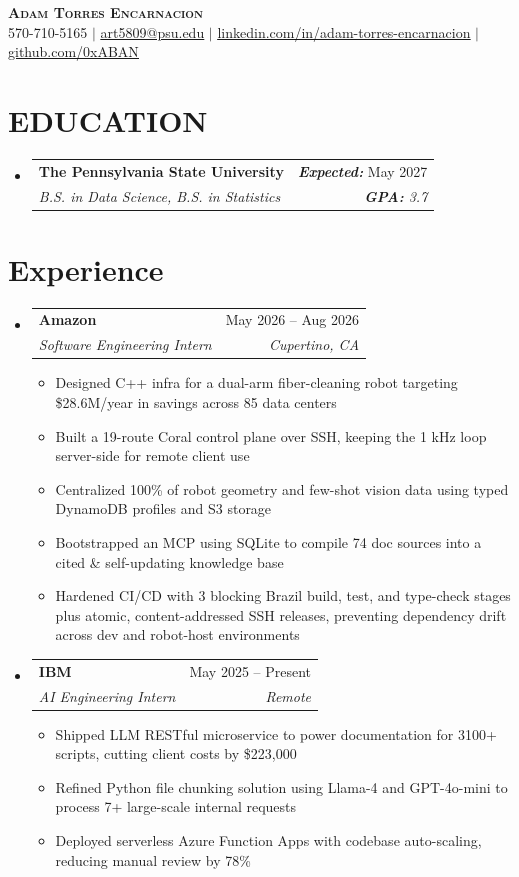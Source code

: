 \documentclass[letterpaper,11pt]{article}
\makeatletter
\newcommand{\resumeItem}[1]{
  \item\small{
    {#1 \vspace{-4pt}}
  }
}
\newcommand{\resumeSubheading}[4]{
  \vspace{-2pt}\item
    \begin{tabular*}{0.97\textwidth}[t]{l@{\extracolsep{\fill}}r}
      \textbf{#1} & #2 \\
      \textit{\small#3} & \textit{\small #4} \\
    \end{tabular*}\vspace{-7pt}
}
\newcommand{\resumeSubHeadingListStart}{\begin{itemize}[leftmargin=0.15in, label={}]}
\newcommand{\resumeSubHeadingListEnd}{\end{itemize}}
\newcommand{\resumeItemListStart}{\begin{itemize}}
\newcommand{\resumeItemListEnd}{\end{itemize}\vspace{-8pt}}
\makeatother
\begin{document}
\begin{center}
    \textbf{\Huge \scshape Adam Torres Encarnacion} \\ \vspace{1pt}
    \small 570-710-5165 $|$ \href{mailto:art5809@psu.edu}{\underline{art5809@psu.edu}} $|$
    \href{https://www.linkedin.com/in/adam-torres-encarnacion/}{\underline{linkedin.com/in/adam-torres-encarnacion}} $|$
    \href{https://github.com/0xABAN}{\underline{github.com/0xABAN}}
\end{center}


\section{\textbf{EDUCATION}}
  \resumeSubHeadingListStart
    \resumeSubheading
    {The Pennsylvania State University}{\textbf{\textit{Expected:}} May 2027}
      {B.S. in Data Science, B.S. in Statistics}{\textbf{\textit{GPA:}} 3.7}
  \resumeSubHeadingListEnd

\section{\textbf{Experience}}
  \resumeSubHeadingListStart
  \resumeSubheading
      {Amazon}{May 2026 -- Aug 2026}
      {Software Engineering Intern}{Cupertino, CA}
      \resumeItemListStart
        \resumeItem{Designed C++ infra for a dual-arm fiber-cleaning robot targeting \$28.6M/year in savings across 85 data centers}
        \resumeItem{Built a 19-route Coral control plane over SSH, keeping the 1 kHz loop server-side for remote client use}
        \resumeItem{Centralized 100\% of robot geometry and few-shot vision data using typed DynamoDB profiles and S3 storage}
        \resumeItem{Bootstrapped an MCP using SQLite to compile 74 doc sources into a cited \& self-updating knowledge base}
        \resumeItem{Hardened CI/CD with 3 blocking Brazil build, test, and type-check stages plus atomic, content-addressed SSH releases, preventing dependency drift across dev and robot-host environments}
      \resumeItemListEnd
    \resumeSubheading
      {IBM}{May 2025 -- Present}
      {AI Engineering Intern}{Remote}
      \resumeItemListStart
        \resumeItem{Shipped LLM RESTful microservice to power documentation for 3100+ scripts, cutting client costs by \$223,000}
        \resumeItem{Refined Python file chunking solution using Llama-4 and GPT-4o-mini to process 7+ large-scale internal requests}
        \resumeItem{Deployed serverless Azure Function Apps with codebase auto-scaling, reducing manual review by 78\%}
      \resumeItemListEnd
  \resumeSubHeadingListEnd
\end{document}
